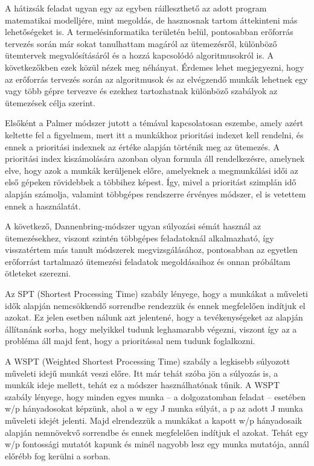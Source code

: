 A hátizsák feladat ugyan egy az egyben ráilleszthető az adott program matematikai modelljére, mint megoldás, de hasznosnak tartom áttekinteni más lehetőségeket is. A termelésinformatika területén belül, pontosabban erőforrás tervezés során már sokat tanulhattam magáról az ütemezésről, különböző ütemtervek megvalósításáról és a hozzá kapcsolódó algoritmusokról is. A következőkben ezek közül nézek meg néhányat. Érdemes lehet megjegyezni, hogy az erőforrás tervezés során az algoritmusok és az elvégzendő munkák lehetnek egy vagy több gépre tervezve és ezekhez tartozhatnak különböző szabályok az ütemezések célja szerint.


Elsőként a Palmer módszer jutott a témával kapcsolatosan eszembe, amely azért keltette fel a figyelmem, mert itt a munkákhoz prioritási indexet kell rendelni, és ennek a prioritási indexnek az értéke alapján történik meg az ütemezés. A prioritási index kiszámolására azonban olyan formula áll rendelkezésre, amelynek elve, hogy azok a munkák kerüljenek előre, amelyeknek a megmunkálási idői az első gépeken rövidebbek a többihez képest. Így, mivel a prioritást szimplán idő alapján számolja, valamint többgépes rendszerre érvényes módszer, el is vetettem ennek a használatát.\cite{palmer}


A következő, Dannenbring-módszer ugyan súlyozási sémát használ az ütemezésekhez, viszont szintén többgépes feladatoknál alkalmazható, így visszatértem más tanult módszerek megvizsgálásához, pontosabban az egyetlen erőforrást tartalmazó ütemezési feladatok megoldásaihoz és onnan próbáltam ötleteket szerezni.


Az SPT (Shortest Processing Time) szabály lényege, hogy a munkákat a műveleti idők alapján nemcsökkendő sorrendbe rendezzük és ennek megfelelően indítjuk el azokat. Ez jelen esetben nálunk azt jelentené, hogy a tevékenységeket az alapján állítanánk sorba, hogy melyikkel tudunk leghamarabb végezni, viszont így az a probléma áll majd fent, hogy a prioritással nem tudunk foglalkozni.\cite{sptwspt}


A WSPT (Weighted Shortest Processing Time) szabály a legkisebb súlyozott műveleti idejű munkát veszi előre. Itt már tehát szóba jön a súlyozás is, a munkák ideje mellett, tehát ez a módszer használhatónak tűnik. A WSPT szabály lényege, hogy minden egyes munka – a dolgozatomban feladat – esetében w/p hányadosokat képzünk, ahol a w egy J munka súlyát, a p az adott J munka műveleti idejét jelenti. Majd elrendezzük a munkákat a kapott w/p hányadosaik alapján nemnövekvő sorrendbe és ennek megfelelően indítjuk el azokat.  Tehát egy w/p fontossági mutatót kapunk és minél nagyobb lesz egy munka mutatója, annál előrébb fog kerülni a sorban.\cite{sptwspt}

